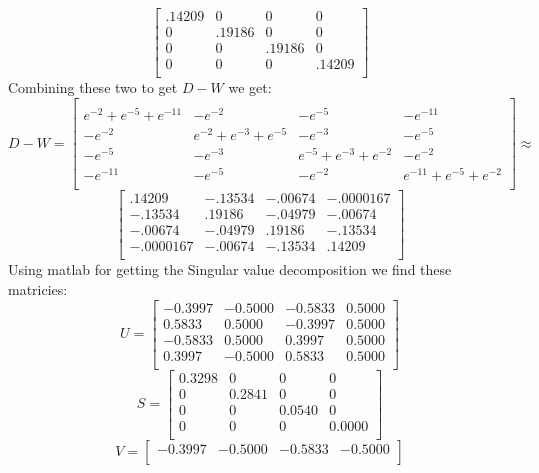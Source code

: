 \documentclass{article}
\begin{document}
\begin{enumerate}
\begin{enumerate}
$$\begin{bmatrix}
.14209 & 0 & 0 & 0 \\
0 & .19186 & 0 & 0 \\
0 & 0 & .19186 & 0 \\
0 & 0 & 0 & .14209 \\
\end{bmatrix}
$$
\newline
Combining these two to get $D-W$ we get:
$$D-W = \begin{bmatrix}
\\
e^{-2} + e^{-5} + e^{-11} & -e^{-2} & -e^{-5} & -e^{-11} \\
-e^{-2}  & e^{-2}  + e^{-3} + e^{-5} & -e^{-3} & -e^{-5} \\
-e^{-5}  & -e^{-3} & e^{-5} + e^{-3} + e^{-2} & -e^{-2}  \\
-e^{-11} & -e^{-5} & -e^{-2} & e^{-11} + e^{-5} + e^{-2} \\
\end{bmatrix} \approx $$
$$\begin{bmatrix}
 .14209  & -.13534 & -.00674 & -.0000167\\
-.13534  &  .19186 & -.04979 & -.00674  \\
-.00674  & -.04979 &  .19186 & -.13534  \\
-.0000167& -.00674 & -.13534 &  .14209  \\
\end{bmatrix}
$$
\newline
Using matlab for getting the Singular value decomposition we find these matricies:
$$
U =
\begin{bmatrix}
-0.3997 & -0.5000 & -0.5833 &  0.5000 \\
 0.5833 &  0.5000 & -0.3997 &  0.5000 \\
-0.5833 &  0.5000 &  0.3997 &  0.5000 \\
 0.3997 & -0.5000 &  0.5833 &  0.5000 \\
\end{bmatrix}$$
$$
S =
\begin{bmatrix}
0.3298 &      0 &      0 &      0 \\
     0 & 0.2841 &      0 &      0 \\
     0 &      0 & 0.0540 &      0 \\
     0 &      0 &      0 & 0.0000 \\
\end{bmatrix}$$
$$
V =
\begin{bmatrix}
-0.3997 & -0.5000 & -0.5833 & -0.5000 \\

\end{bmatrix}$$
\end{enumerate}
\end{enumerate}
\end{document}
